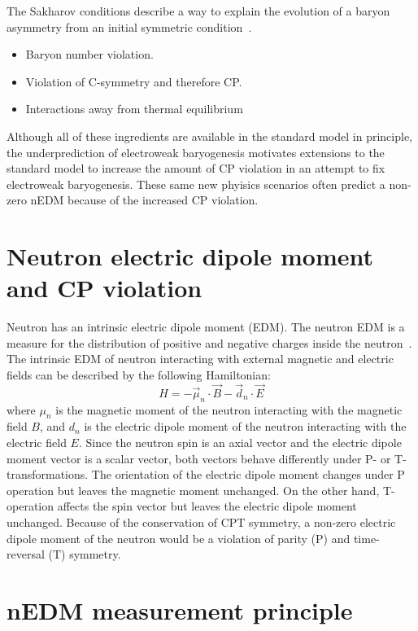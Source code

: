 The Sakharov conditions describe a way to explain the evolution of a
baryon asymmetry from an initial symmetric
condition~\cite{budker2013optical,PhysRevLett.10.531}.
\begin{itemize}
    \item Baryon number violation.
    \item Violation of C-symmetry and therefore CP.
    \item Interactions away from thermal equilibrium
\end{itemize}
Although all of these ingredients are available in the standard model
in principle, the underprediction of electroweak baryogenesis
motivates extensions to the standard model to increase the amount of
CP violation in an attempt to fix electroweak baryogenesis.  These
same new phyisics scenarios often predict a non-zero nEDM because of
the increased CP violation.


\section{Neutron electric dipole moment and CP violation }  

Neutron has an intrinsic electric dipole moment (EDM).  The neutron
EDM is a measure for the distribution of positive and negative charges
inside the neutron~\cite{bib:chuppetal}.  The intrinsic EDM of neutron
interacting with external magnetic and electric fields can be
described by the following Hamiltonian:
\begin{equation}\label{my_first_eqn}  
  H=-\vec{\mu}_n\cdot\vec{B}-\vec{d}_n\cdot\vec{E}
\end{equation}
where $\mu_n$ is the magnetic moment of the neutron interacting with
the magnetic field $B$, and $d_n$ is the electric dipole moment of the
neutron interacting with the electric field $E$.  Since the neutron
spin is an axial vector and the electric dipole moment vector is a
scalar vector, both vectors behave differently under P- or
T-transformations.  The orientation of the electric dipole moment
changes under P operation but leaves the magnetic moment unchanged. On
the other hand, T-operation affects the spin vector but leaves the
electric dipole moment unchanged.  Because of the conservation of CPT
symmetry, a non-zero electric dipole moment of the neutron would be a
violation of parity (P) and time-reversal (T) symmetry.

\section{nEDM measurement principle}

